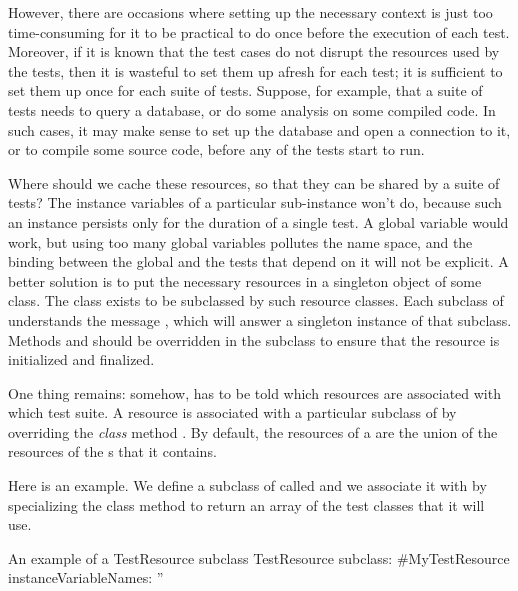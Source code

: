 \documentclass[a4paper,10pt,twoside]{book}
\begin{document}
{However, there are occasions where setting up the necessary context is just too time-consuming for it to be practical to do once before the execution of each test.
Moreover, if it is known that the test cases do not disrupt the resources used by the tests, then it is wasteful to set them up afresh for each test; it is sufficient to set them up once for each suite of tests.
Suppose, for example, that a suite of tests needs to query a database, or do some analysis on some compiled code.
In such cases, it may make sense to set up the database and open a connection to it, or to compile some source code, before any of the tests start to run.

Where should we cache these resources, so that they can be shared by a suite of tests?
The instance variables of a particular  sub-instance won't do, because such an instance persists only for the duration of a single test.
A global variable would work, but using too many global variables pollutes the name space, and the binding between the global and the tests that depend on it will not be explicit.
A better solution is to put the necessary resources in a singleton object of some class.
The class  exists to be subclassed by such resource classes.
Each subclass of  understands the message  , which will answer a singleton instance of that subclass.
Methods  and  should be overridden in the subclass to ensure that the resource is initialized and finalized.

One thing remains: somehow, \sunit has to be told which resources are associated with which test suite.
A resource is associated
with a particular subclass of  
by overriding the \emph{class} method .
By default, the resources of 
a  are
the union of the resources of
the s that it contains.

Here is an example. 
We define a subclass of  called
 and we associate it with 
by specializing the class method  to return an array
of the test classes that it will use.

\begin{classdef}[mytestresource]{An example of a TestResource subclass}
TestResource subclass: #MyTestResource
	instanceVariableNames: ''


\end{classdef}}
\end{document}
